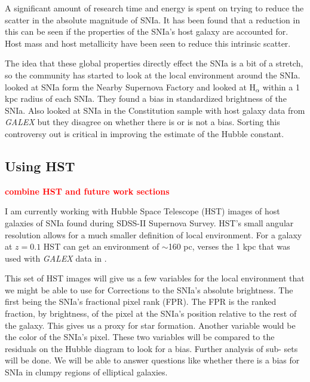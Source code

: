 \documentclass[apj, iop]{emulateapj}
\newcommand{\sn}{SNIa}
\newcommand{\todo}[1]{\textbf{\textcolor{red}{#1}}}
\begin{document}
A significant amount of research time and energy is spent on trying to reduce
the scatter in the absolute magnitude of SNIa. It has been found that a
reduction in this can be seen if the properties of the SNIa's host galaxy are
accounted for. Host mass \citep{Childress13} and host metallicity \citep{Hayden13}
have been seen to reduce this intrinsic scatter.

The idea that these global properties directly effect the \sn{} is a bit of a
stretch, so the community has started to look at the local environment around
the SNIa. \cite{Rigault13} looked at \sn{} form the Nearby Supernova Factory and
looked at H$_{\alpha}$ within a 1 kpc radius of each SNIa. They found  a bias in
standardized brightness of the SNIa. Also \cite{Rigault15, Jones15} looked at
\sn{} in the Constitution sample with host galaxy data from {\it GALEX} but they
disagree on whether there is or is not a bias. Sorting this controversy out is
critical in improving the estimate of the Hubble constant.

\subsection{Using HST}\label{using-hst}

\todo{combine HST and future work sections}

I am currently working with Hubble Space Telescope (HST) images of host galaxies
of \sn{} found during SDSS-II Supernova Survey. HST's small angular resolution
allows for a much smaller definition of local environment. For a galaxy at $z =
0.1$ HST can get an environment of $\sim$160 pc, verses the 1 kpc that was used 
with {\it GALEX} data in \cite{Jones15,Rigault15}.

This set of HST images will give us a few variables for the local environment
that we might be able to use for Corrections to the SNIa's absolute brightness.
The first being the SNIa's fractional pixel rank (FPR). The FPR is the ranked
fraction, by brightness, of the pixel at the SNIa's position relative to the
rest of the galaxy. This gives us a proxy for star formation. Another variable
would be the color of the SNIa's pixel. These two variables will be compared to
the residuals on the Hubble diagram to look for a bias. Further analysis of sub-
sets will be done. We will be able to answer questions like whether there is a
bias for \sn{} in clumpy regions of elliptical galaxies.
\end{document}

